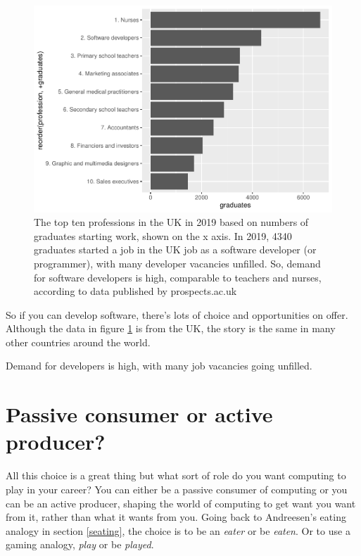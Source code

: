 \documentclass[
]{book}
\begin{document}
\begin{figure}

{\centering \includegraphics[width=1\linewidth]{cdyf_files/figure-latex/nurses-fig-1} 

}

\caption{The top ten professions in the UK in 2019 based on numbers of graduates starting work, shown on the x axis. In 2019, 4340 graduates started a job in the UK job as a software developer (or programmer), with many developer vacancies unfilled. So, demand for software developers is high, comparable to teachers and nurses, according to data published by prospects.ac.uk \citep{labourmarket2022}}\label{fig:nurses-fig}
\end{figure}



So if you can develop software, there's lots of choice and opportunities on offer. Although the data in figure \ref{fig:nurses-fig} is from the UK, the story is the same in many other countries around the world.

Demand for developers is high, with many job vacancies going unfilled.

\hypertarget{passive}{%
\section{Passive consumer or active producer?}\label{passive}}

All this choice is a great thing but what sort of role do you want computing to play in your career? You can either be a passive consumer of computing or you can be an active producer, shaping the world of computing to get want you want from it, rather than what it wants from you. Going back to Andreesen's eating analogy in section \ref{seating}, the choice is to be an \emph{eater} or be \emph{eaten}. Or to use a gaming analogy, \emph{play} or be \emph{played}.
\end{document}
